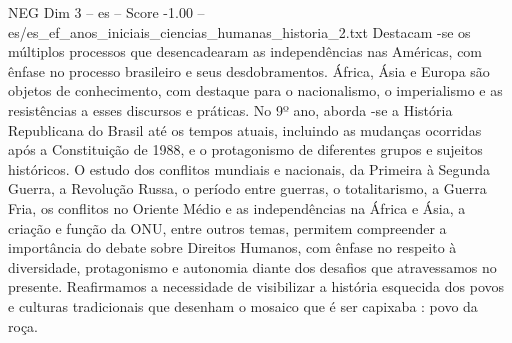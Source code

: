 \begin{textsample}{NEG Dim 3 – es – Score -1.00 – es/es\_ef\_anos\_iniciais\_ciencias\_humanas\_historia\_2.txt}  \label{ex:f3_neg_178}
Destacam -se os múltiplos processos que desencadearam as independências nas Américas, com ênfase no processo brasileiro e seus desdobramentos.
África, Ásia e Europa são objetos de conhecimento, com destaque para o nacionalismo, o imperialismo e as resistências a esses discursos e práticas.
No 9º ano, aborda -se a História Republicana do Brasil até os tempos atuais, incluindo as mudanças ocorridas após a Constituição de 1988, e o protagonismo de diferentes grupos e sujeitos históricos.
O estudo dos conflitos mundiais e nacionais, da Primeira à Segunda Guerra, a Revolução Russa, o período entre guerras, o totalitarismo, a Guerra Fria, os conflitos no Oriente Médio e as independências na África e Ásia, a criação e função da ONU, entre outros temas, permitem compreender a importância do debate sobre Direitos Humanos, com ênfase no respeito à diversidade, protagonismo e autonomia diante dos desafios que atravessamos no presente.
Reafirmamos a necessidade de visibilizar a história esquecida dos povos e culturas tradicionais que desenham o mosaico que é ser capixaba : povo da roça.

\end{textsample}
